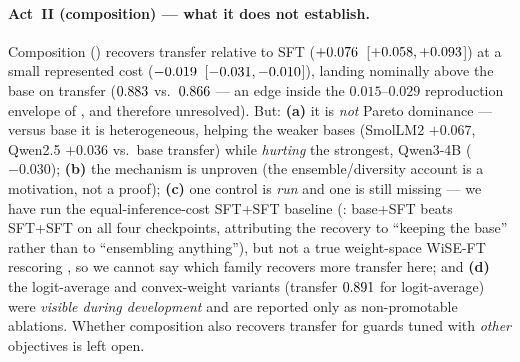 \paragraph{Act~II (composition) --- what it does not establish.} Composition () recovers transfer relative to SFT ($+0.076$~[$+0.058,+0.093$]) at a small represented cost ($-0.019$~[$-0.031,-0.010$]), landing nominally above the base on transfer ($0.883$ vs.\ $0.866$ --- an edge inside the $0.015$--$0.029$ reproduction envelope of , and therefore unresolved). But: \textbf{(a)} it is \emph{not} Pareto dominance --- versus base it is heterogeneous, helping the weaker bases (SmolLM2 $+0.067$, Qwen2.5 $+0.036$ vs.\ base transfer) while \emph{hurting} the strongest, Qwen3-4B ($-0.030$); \textbf{(b)} the mechanism is unproven (the ensemble/diversity account is a motivation, not a proof); \textbf{(c)} one control is \emph{run} and one is still missing --- we have run the equal-inference-cost SFT+SFT baseline (: base+SFT beats SFT+SFT on all four checkpoints, attributing the recovery to ``keeping the base'' rather than to ``ensembling anything''), but not a true weight-space WiSE-FT rescoring \citep{wortsman2022wiseft}, so we cannot say which family recovers more transfer here; and \textbf{(d)} the logit-average and convex-weight variants (transfer $0.891$ for logit-average) were \emph{visible during development} and are reported only as non-promotable ablations. Whether composition also recovers transfer for guards tuned with \emph{other} objectives is left open.

